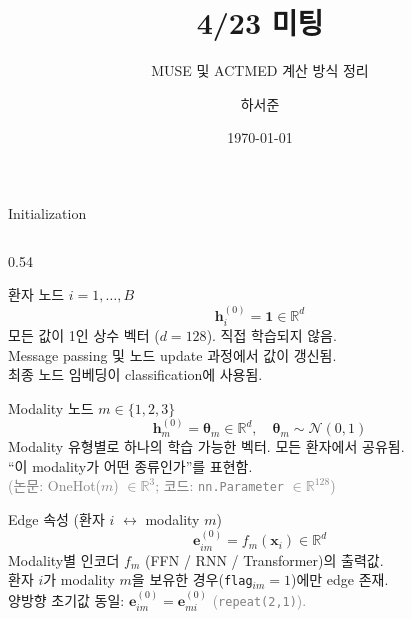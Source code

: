 \documentclass[
11pt,notheorems,hyperref={pdfauthor=whatever}
]{beamer}
\title[]{4/23 미팅}
\subtitle{MUSE 및 ACTMED 계산 방식 정리}
\author[]{하서준}
\institute{DGIST}
\date{\today}
\begin{document}
{
\begin{frame}
  \titlepage
\end{frame}
}
\addtocounter{framenumber}{-1}

\begin{frame}{Initialization}
\begin{columns}[c]

\begin{column}{0.54\textwidth}

    \begin{block}{환자 노드 \quad $i = 1, \dots, B$}
    \[
        \mathbf{h}_i^{(0)} = \mathbf{1} \in \mathbb{R}^{d}
    \]
    \footnotesize
    모든 값이 1인 상수 벡터 ($d=128$). 직접 학습되지 않음.\\
    Message passing 및 노드 update 과정에서 값이 갱신됨.\\
    최종 노드 임베딩이 classification에 사용됨.
    \end{block}

    \vspace{0.1em}

    \begin{block}{Modality 노드 \quad $m \in \{1,2,3\}$}
    \[
        \mathbf{h}_m^{(0)} = \boldsymbol{\theta}_m \in \mathbb{R}^{d},
        \quad \boldsymbol{\theta}_m \sim \mathcal{N}(0,1)
    \]
    \footnotesize
    Modality 유형별로 하나의 학습 가능한 벡터. 모든 환자에서 공유됨.\\
    ``이 modality가 어떤 종류인가''를 표현함.\\
    \textcolor{gray}{(논문: OneHot($m$) $\in\mathbb{R}^3$;\; 코드: \texttt{nn.Parameter} $\in\mathbb{R}^{128}$)}
    \end{block}

    \vspace{0.1em}

    \begin{block}{Edge 속성 \quad (환자 $i$ $\leftrightarrow$ modality $m$)}
    \[
        \mathbf{e}_{im}^{(0)} = f_m(\mathbf{x}_i) \in \mathbb{R}^{d}
    \]
    \footnotesize
    Modality별 인코더 $f_m$ (FFN / RNN / Transformer)의 출력값.\\
    환자 $i$가 modality $m$을 보유한 경우(\texttt{flag}$_{im}=1$)에만 edge 존재.\\
    양방향 초기값 동일: $\mathbf{e}_{im}^{(0)} = \mathbf{e}_{mi}^{(0)}$
    \textcolor{gray}{(\texttt{repeat(2,1)}).}
    \end{block}


\end{column}
\end{columns}
\end{frame}
\end{document}
